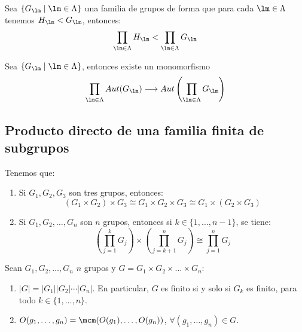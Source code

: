 \begin{teo}
    Sea $\{G_\lm \mid \lm \in \Lambda\}$ una familia de grupos de forma que para cada $\lm\in \Lambda$ tenemos $H_\lm < G_\lm$, entonces:
    \begin{equation*}
        \prod_{\lm\in \Lambda} H_\lm < \prod_{\lm\in \Lambda} G_\lm
    \end{equation*}
\end{teo}

\begin{teo}
    Sea $\{G_\lm \mid \lm \in \Lambda\}$, entonces existe un monomorfismo
    \begin{equation*}
        \prod_{\lm\in \Lambda}Aut(G_\lm) \longrightarrow Aut\left(\prod_{\lm\in \Lambda} G_\lm\right)
    \end{equation*}
\end{teo}

\subsection{Producto directo de una familia finita de subgrupos}

\begin{teo}
    Tenemos que:
    \begin{enumerate}
        \item Si $G_1,G_2,G_3$ son tres grupos, entonces:
            \begin{equation*}
                (G_1\times G_2) \times G_3 \cong G_1 \times G_2 \times G_3 \cong G_1\times (G_2\times G_3)
            \end{equation*}
        \item Si $G_1,G_2,\ldots,G_n$ son $n$ grupos, entonces si $k\in \{1,\ldots,n-1\}$, se tiene:
            \begin{equation*}
                \left(\prod_{j=1}^{k}G_j\right) \times \left(\prod_{j=k+1}^{n}G_j\right) \cong \prod_{j=1}^{n}G_j
            \end{equation*}
    \end{enumerate}
\end{teo}

\begin{teo}
    Sean $G_1,G_2,\ldots,G_n$ $n$ grupos y $G = G_1\times G_2 \times \ldots \times G_n$:
    \begin{enumerate}
        \item $|G| = |G_1| |G_2| \cdots |G_n| $. En particular, $G$ es finito si y solo si $G_k$ es finito, para todo $k\in \{1,\ldots,n\}$.
        \item $O(g_1,\ldots,g_n) = \mcm(O(g_1), \ldots, O(g_n))$, $\forall (g_1,\ldots,g_n)\in G$.
    \end{enumerate}
\end{teo}

